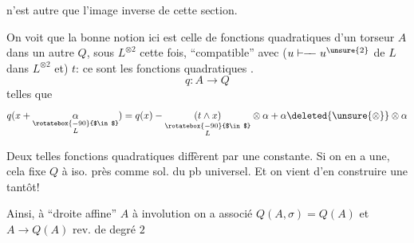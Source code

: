 n'est autre que l'image inverse de cette
section.

On voit que la bonne notion ici
est celle de fonctions  quadratiques
d'un torseur $A$ dans un autre
$Q$, sous $L^{\otimes 2}$ cette fois, ``compatible''
avec \deleted{\unsure{$\sigma$}} ($u\mathrel{\vdash\!\!-\!\!-}u^{\unsure{2}}$ de $L$ dans $L^{\otimes 2}$ et) $t$: ce
sont les fonctions  quadratiques
 .
\[
q:A\longrightarrow Q
\]
telles que
\[
q(x+\underset{\substack{\rotatebox{-90}{$\in$}\\L}}{\alpha})=q(x)-
\underset{\substack{\rotatebox{-90}{$\in$}\\L}}{(t\wedge x)}\otimes\alpha+
\alpha\deleted{\unsure{\otimes}}\otimes\alpha
\]

Deux telles fonctions  quadratiques diffèrent
par une constante. Si on en a une,
cela fixe $Q$ à iso. près comme
sol. du pb universel. Et on vient
d'en construire une tantôt!

Ainsi, à  ``droite affine'' $A$ à involution
on a associé $Q(A,\sigma)=Q(A)$
et $A\longrightarrow Q(A)$ rev. de degré $2$
